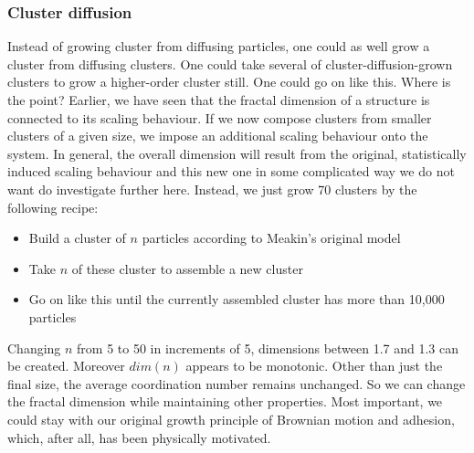 \documentclass[twocolumn,10pt]{scrartcl}
\begin{document}
            \subsubsection{Cluster diffusion}
                Instead of growing cluster from diffusing particles, one could as well grow a cluster from diffusing
                clusters. One could take several of cluster-diffusion-grown clusters to grow a higher-order cluster
                still. One could go on like this. Where is the point? Earlier, we have seen that the fractal dimension
                of a structure is connected to its scaling behaviour. If we now compose clusters from smaller clusters
                of a given size, we impose an additional scaling behaviour onto the system. In general, the overall
                dimension will result from the original, statistically induced scaling behaviour and this new one in
                some complicated way we do not want do investigate further here. Instead, we just grow 70 clusters by the
                following recipe:
                \begin{itemize}
                    \item Build a cluster of $n$ particles according to Meakin's original model
                    \item Take $n$ of these cluster to assemble a new cluster
                    \item Go on like this until the currently assembled cluster has more than 10,000 particles
                \end{itemize}
                Changing $n$ from 5 to 50 in increments of 5, dimensions between 1.7 and 1.3 can be created. Moreover
                $dim(n)$ appears to be monotonic. Other than just the final size, the average coordination number
                remains unchanged. So we can change the fractal dimension while maintaining other properties.
                Most important, we could stay with our original growth principle of Brownian motion and adhesion,
                which, after all, has been physically motivated.
\end{document}
